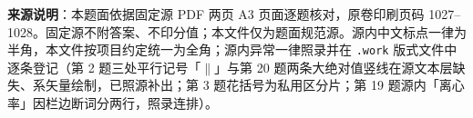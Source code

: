 


\begin{gktip}
\textbf{来源说明}：本题面依据固定源 PDF 两页 A3 页面逐题核对，原卷印刷页码 1027–1028。固定源不附答案、不印分值；本文件仅为题面规范源。源内中文标点一律为半角，本文件按项目约定统一为全角；源内异常一律照录并在 \texttt{.work} 版式文件中逐条登记（第 2 题三处平行记号「$\parallel$」与第 20 题两条大绝对值竖线在源文本层缺失、系矢量绘制，已照源补出；第 3 题花括号为私用区分片；第 19 题源内「离心率」因栏边断词分两行，照录连排）。
\end{gktip}


